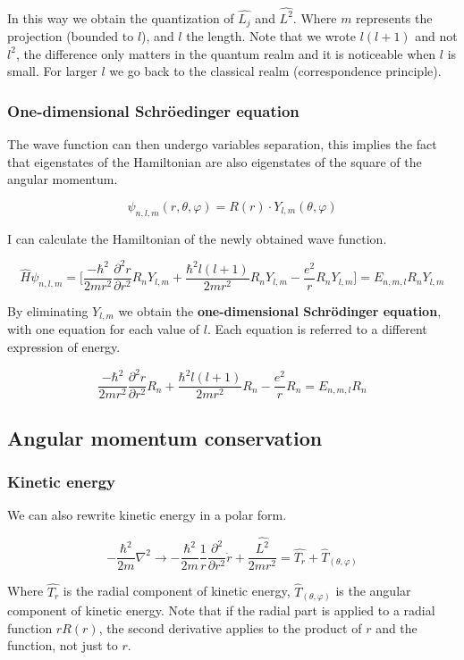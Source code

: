 		In this way we obtain the quantization of $\hat{L_j}$ and $\hat{L^2}$.
		Where $m$ represents the projection (bounded to $l$), and $l$ the length.
		Note that we wrote $l(l+1)$ and not $l^2$, the difference only matters in the quantum realm and it is noticeable when $l$ is small.
		For larger $l$ we go back to the classical realm (correspondence principle).

		\subsubsection{One-dimensional Schr\"oedinger equation}
		The wave function can then undergo variables separation, this implies the fact that eigenstates of the Hamiltonian are also eigenstates of the square of the angular momentum.

		$$\psi_{n,l,m}(r,\theta,\varphi)=R(r)\cdot Y_{l,m}(\theta,\varphi)$$

		I can calculate the Hamiltonian of the newly obtained wave function.

		$$\hat{H}\psi_{n,l,m}=\bigg[\frac{-\hbar^2}{2mr^2}\frac{\partial^2r}{\partial r^2}R_nY_{l,m}+\frac{\hbar^2l(l+1)}{2mr^2}R_nY_{l,m}-\frac{e^2}{r}R_nY_{l,m}\bigg]=E_{n,m,l}R_nY_{l,m}$$

		By eliminating $Y_{l,m}$ we obtain the \textbf{one-dimensional Schr\"odinger equation}, with one equation for each value of $l$.
		Each equation is referred to a different expression of energy.

		$$\frac{-\hbar^2}{2mr^2}\frac{\partial^2r}{\partial r^2}R_n+\frac{\hbar^2l(l+1)}{2mr^2}R_n-\frac{e^2}{r}R_n=E_{n,m,l}R_n$$

	\subsection{Angular momentum conservation}

		\subsubsection{Kinetic energy}
		We can also rewrite kinetic energy in a polar form.

		$$-\frac{\hbar^2}{2m}\nabla^2 \rightarrow-\frac{\hbar^2}{2m}\frac{1}{r}\frac{\partial^2}{\partial r^2}\dot{r}+\frac{\hat{L^2}}{2mr^2} = \hat{T_r}+\hat{T}_{(\theta,\varphi)}$$

		Where $\hat{T_r}$ is the radial component of kinetic energy, $\hat{T}_{(\theta,\varphi)}$ is the angular component of kinetic energy.
		Note that if the radial part is applied to a radial function $rR(r)$, the second derivative applies to the product of $r$ and the function, not just to $r$.

